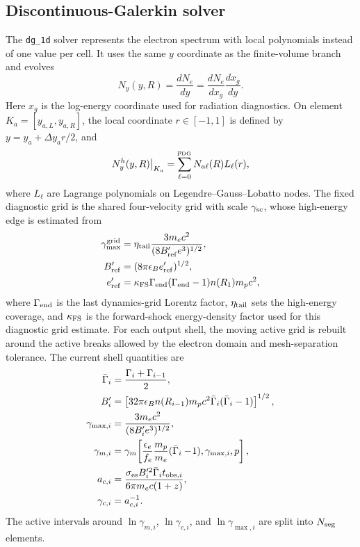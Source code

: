 \documentclass[twocolumn]{aastex702}
\begin{document}
\subsection{Discontinuous-Galerkin solver}

The \texttt{dg\_1d} solver represents the electron spectrum with local
polynomials instead of one value per cell.  It uses the same \(y\) coordinate as
the finite-volume branch and evolves
\begin{equation}
N_y(y,R)=\frac{dN_e}{dy}
=\frac{dN_e}{dx_g}\frac{dx_g}{dy}.
\end{equation}
Here \(x_g\) is the log-energy coordinate used for radiation diagnostics.  On
element \(K_a=[y_{a,L},y_{a,R}]\), the local coordinate
\(r\in[-1,1]\) is defined by \(y=y_a+\Delta y_ar/2\), and
\begin{equation}
N_y^h(y,R)\big|_{K_a}=
\sum_{\ell=0}^{p_{\rm DG}}N_{a\ell}(R)L_\ell(r),
\end{equation}
where \(L_\ell\) are Lagrange polynomials on Legendre--Gauss--Lobatto nodes.
The fixed diagnostic grid is the shared four-velocity grid with scale
\(\gamma_{\rm sc}\), whose high-energy edge is estimated from
\begin{equation}
\begin{aligned}
\gamma_{\max}^{\rm grid}
&=\eta_{\rm tail}
\frac{3m_ec^2}{(8B'_{\rm ref}e^3)^{1/2}},\\
B'_{\rm ref}&=(8\pi\epsilon_B e'_{\rm ref})^{1/2},\\
e'_{\rm ref}
&=\kappa_{\rm FS}\Gamma_{\rm end}(\Gamma_{\rm end}-1)n(R_1)m_pc^2,
\end{aligned}
\end{equation}
where \(\Gamma_{\rm end}\) is the last dynamics-grid Lorentz factor,
\(\eta_{\rm tail}\) sets the high-energy coverage, and \(\kappa_{\rm FS}\) is the
forward-shock energy-density factor used for this diagnostic grid estimate.
For each output shell, the moving active grid is rebuilt around the active
breaks allowed by the electron domain and mesh-separation tolerance.  The current
shell quantities are
\begin{equation}
\begin{aligned}
\bar\Gamma_i&=\frac{\Gamma_i+\Gamma_{i-1}}{2},\\
B_i'&=\left[32\pi\epsilon_B n(R_{i-1})m_pc^2
\bar\Gamma_i(\bar\Gamma_i-1)\right]^{1/2},\\
\gamma_{\max,i}&=\frac{3m_ec^2}{(8B_i'e^3)^{1/2}},\\
\gamma_{m,i}&=\gamma_m\!\left[
\frac{\epsilon_e}{f_e}\frac{m_p}{m_e}(\bar\Gamma_i-\!1),
\gamma_{\max,i},p\right],\\
a_{c,i}&=\frac{\sigma_{\rm es}B_i'^2\bar\Gamma_i t_{{\rm obs},i}}
{6\pi m_ec(1+z)},\\
\gamma_{c,i}&=a_{c,i}^{-1}.
\end{aligned}
\end{equation}
The active intervals around \(\ln\gamma_{m,i}\), \(\ln\gamma_{c,i}\), and
\(\ln\gamma_{\max,i}\) are split into \(N_{\rm seg}\) elements.
\end{document}
